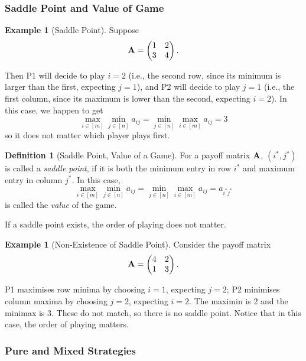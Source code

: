 \documentclass[11pt]{article}
\theoremstyle{definition}
\newtheorem{definition}[theorem]{Definition}
\newtheorem{example}[theorem]{Example}
\theoremstyle{remark}
\newcommand{\pqty}[1]{\left(#1\right)}
\newcommand{\bqty}[1]{\left[#1\right]}
\newcommand{\pmqty}[1]{\begin{pmatrix}#1\end{pmatrix}}
\begin{document}
\subsubsection{Saddle Point and Value of Game}

\begin{example}[Saddle Point]\label{optim-unit-0057}
    Suppose
    \[
        \vb{A} = \pmqty{1 & 2 \\ 3 & 4}.
    \]

    Then P1 will decide to play \(i = 2\) (i.e., the second row, since its minimum is larger than the first, expecting \(j = 1\)), and P2 will decide to play \(j = 1\) (i.e., the first column, since its maximum is lower than the second, expecting \(i = 2\)). In this case, we happen to get
    \[
        \max_{i \in \bqty{m}} \min_{j \in \bqty{n}} a_{ij} = \min_{j \in \bqty{n}} \max_{i \in \bqty{m}} a_{ij} = 3
    \]
    so it does not matter which player plays first.
\end{example}

\begin{definition}[Saddle Point, Value of a Game]\label{optim-unit-0058}
    For a payoff matrix \(\vb{A}\), \(\pqty{i^{\ast}, j^{\ast}}\) is called a \emph{saddle point}, if it is both the minimum entry in row \(i^{\ast}\) and maximum entry in column \(j^{\ast}\). In this case,
    \[
        \max_{i \in \bqty{m}} \min_{j \in \bqty{n}} a_{ij} = \min_{j \in \bqty{n}} \max_{i \in \bqty{m}} a_{ij} = a_{i^{\ast}j^{\ast}}
    \]
    is called the \emph{value} of the game.
\end{definition}

If a saddle point exists, the order of playing does not matter.

\begin{example}[Non-Existence of Saddle Point]\label{optim-unit-0059}
    Consider the payoff matrix
    \[
        \vb{A} = \pmqty{4 & 2 \\ 1 & 3}.
    \]

    P1 maximises row minima by choosing \(i=1\), expecting \(j=2\); P2 minimises column maxima by choosing \(j=2\), expecting \(i=2\). The maximin is 2 and the minimax is 3. These do not match, so there is no saddle point. Notice that in this case, the order of playing matters.
\end{example}

\subsubsection{Pure and Mixed Strategies}
\end{document}
